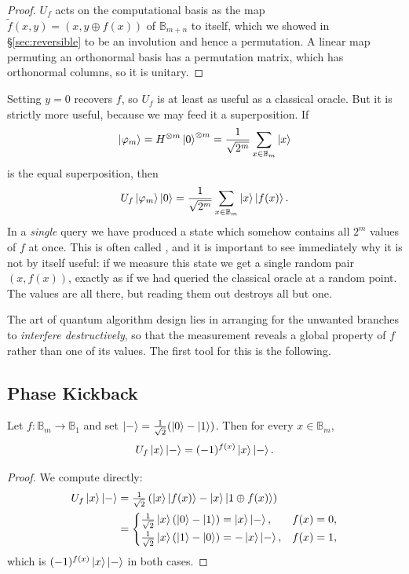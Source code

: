 \documentclass[a4paper]{scrartcl}
\newcommand{\bits}[1]{\mathbb{B}_{#1}}
\begin{document}
\begin{proof}
	$U_f$ acts on the computational basis as the map $\widetilde f(x,y) = (x, y\oplus f(x))$ of $\bits{m+n}$ to itself, which we showed in \S\ref{sec:reversible} to be an involution and hence a permutation. A linear map permuting an orthonormal basis has a permutation matrix, which has orthonormal columns, so it is unitary.
\end{proof}

Setting $y = 0$ recovers $f$, so $U_f$ is at least as useful as a classical oracle. But it is strictly more useful, because we may feed it a superposition. If
$$\ket{\varphi_m} = H^{\otimes m}\ket{0}^{\otimes m} = \frac{1}{\sqrt{2^m}}\sum_{x\in\bits m}\ket{x}$$
is the equal superposition, then
$$U_f\ket{\varphi_m}\ket{0} = \frac{1}{\sqrt{2^m}}\sum_{x\in\bits m}\ket{x}\ket{f(x)}.$$
In a \emph{single} query we have produced a state which somehow contains all $2^m$ values of $f$ at once. This is often called , and it is important to see immediately why it is not by itself useful: if we measure this state we get a single random pair $(x,f(x))$, exactly as if we had queried the classical oracle at a random point. The values are all there, but reading them out destroys all but one.

The art of quantum algorithm design lies in arranging for the unwanted branches to \emph{interfere destructively}, so that the measurement reveals a global property of $f$ rather than one of its values. The first tool for this is the following.

\subsection{Phase Kickback}\label{sec:kickback}

\begin{proposition}
	Let $f:\bits m\to\bits1$ and set $\ket{-} = \tfrac1{\sqrt2}(\ket{0}-\ket{1})$. Then for every $x \in \bits m$,
	$$U_f\ket{x}\ket{-} = (-1)^{f(x)}\ket{x}\ket{-}.$$
\end{proposition}

\begin{proof}
	We compute directly:
	\begin{align*}
		U_f\ket{x}\ket{-} &= \tfrac1{\sqrt2}\left(\ket{x}\ket{f(x)} - \ket{x}\ket{1\oplus f(x)}\right)\\
		&= \begin{cases}\tfrac1{\sqrt2}\ket{x}(\ket0-\ket1) = \ket x\ket-, & f(x)=0,\\[2pt] \tfrac1{\sqrt2}\ket x(\ket1-\ket0) = -\ket x\ket-, & f(x)=1,\end{cases}
	\end{align*}
	which is $(-1)^{f(x)}\ket x\ket-$ in both cases.
\end{proof}
\end{document}
